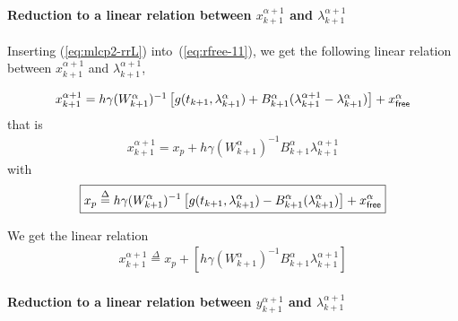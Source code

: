 \paragraph{Reduction to a linear relation between  $x^{\alpha+1}_{k+1}$ and
$\lambda^{\alpha+1}_{k+1}$}

Inserting (\ref{eq:mlcp2-rrL}) into~(\ref{eq:rfree-11}), we get the following linear relation between $x^{\alpha+1}_{k+1}$ and
$\lambda^{\alpha+1}_{k+1}$, 

\begin{equation}
   \begin{array}{l}
     x^{\alpha+1}_{k+1} = h\gamma(W^{\alpha}_{k+1} )^{-1}\left[g(t_{k+1},\lambda^{\alpha}_{k+1}) +
    B^{\alpha}_{k+1} (\lambda^{\alpha+1}_{k+1} - \lambda^{\alpha}_{k+1}) \right ] +x^\alpha_{{\sf free}}
\end{array}
\end{equation}
that is 
\begin{equation}
  \begin{array}{l}
   x^{\alpha+1}_{k+1} =x_p + h \gamma (W^{\alpha}_{k+1})^{-1}    B^{\alpha}_{k+1} \lambda^{\alpha+1}_{k+1}
   \end{array}
\end{equation}
with 
\begin{equation}
  \boxed{x_p \stackrel{\Delta}{=}  h\gamma(W^{\alpha}_{k+1} )^{-1}\left[g(t_{k+1},\lambda^{\alpha}_{k+1}) 
    -B^{\alpha}_{k+1} (\lambda^{\alpha}_{k+1}) \right ] +x^\alpha_{{\sf free}}}
\end{equation}


We get the linear relation
\begin{equation}
  \label{eq:mlcp2-rfree-13}
  \begin{array}{l}
 \boxed{   x^{\alpha+1}_{k+1}\stackrel{\Delta}{=} x_p + \left[ h \gamma (W^{\alpha}_{k+1})^{-1}    B^{\alpha}_{k+1} \lambda^{\alpha+1}_{k+1}\right]}
   \end{array}
\end{equation}




\paragraph{Reduction to a linear relation between  $y^{\alpha+1}_{k+1}$ and
$\lambda^{\alpha+1}_{k+1}$}

